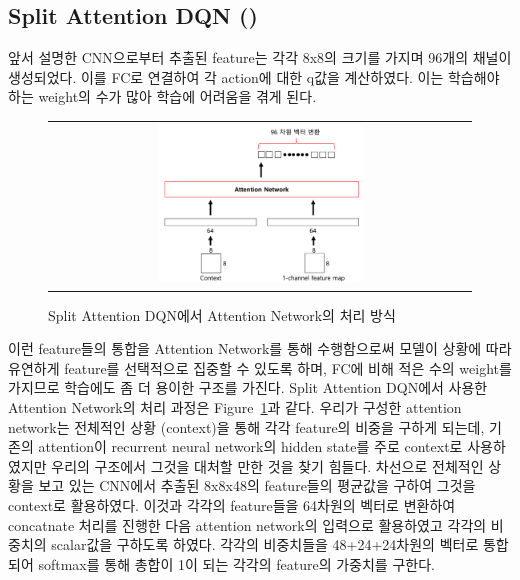 \subsection{Split Attention DQN (\sadqnname)}
\label{sec:method:idea}
앞서 설명한  CNN으로부터 추출된 feature는 각각 8x8의 크기를 가지며 96개의 채널이 생성되었다.
 이를 FC로 연결하여 각 action에 대한 q값을 계산하였다.
이는 학습해야 하는 weight의 수가 많아 학습에 어려움을 겪게 된다.
%
\begin{figure}[ht]
\begin{center}
\begin{tabular}{c}
     \includegraphics[width=0.5\textwidth]{FIG/split_attention.png} \\
\end{tabular}
\caption{
	Split Attention DQN에서 Attention Network의 처리 방식
}
\label{fig:split_attention}
\end{center}
\end{figure}

 이런 feature들의 통합을 Attention Network를 통해 수행함으로써 모델이 상황에 따라 유연하게 feature를 선택적으로 집중할 수 있도록 하며, FC에 비해 적은 수의 weight를 가지므로 학습에도 좀 더 용이한 구조를 가진다.
Split Attention DQN에서 사용한 Attention Network의 처리 과정은 Figure~\ref{fig:split_attention}과 같다.
우리가 구성한 attention network는 전체적인 상황 (context)을 통해 각각 feature의 비중을 구하게 되는데, 기존의 attention이 recurrent neural network의 hidden state를 주로 context로 사용하였지만 우리의 구조에서 그것을 대처할 만한 것을 찾기 힘들다.
차선으로 전체적인 상황을 보고 있는 CNN에서 추출된 8x8x48의 feature들의 평균값을 구하여 그것을 context로 활용하였다.
이것과 각각의 feature들을 64차원의 벡터로 변환하여 concatnate 처리를 진행한 다음 attention network의 입력으로 활용하였고 각각의 비중치의 scalar값을 구하도록 하였다.
각각의 비중치들을 48+24+24차원의 벡터로 통합되어 softmax를 통해 총합이 1이 되는 각각의 feature의 가중치를 구한다.








